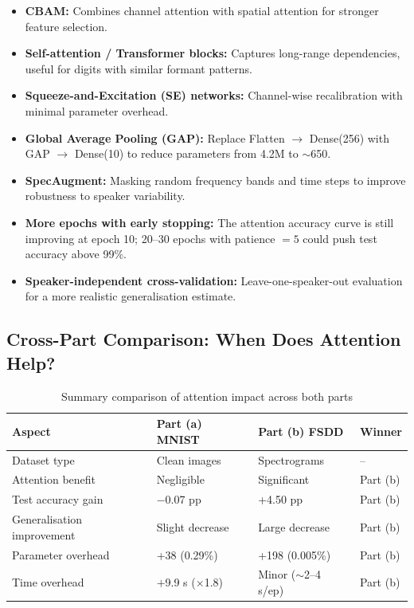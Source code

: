 \begin{itemize}[leftmargin=1.5em]
    \item \textbf{CBAM:} Combines channel attention with spatial attention for
	    stronger feature selection.
    \item \textbf{Self-attention / Transformer blocks:} Captures long-range
	    dependencies, useful for digits with similar formant patterns.
    \item \textbf{Squeeze-and-Excitation (SE) networks:} Channel-wise recalibration
	    with minimal parameter overhead.
    \item \textbf{Global Average Pooling (GAP):} Replace Flatten $\to$ Dense(256)
	    with GAP $\to$ Dense(10) to reduce parameters from 4.2M to $\sim$650.
    \item \textbf{SpecAugment:} Masking random frequency bands and time steps to
	    improve robustness to speaker variability.
    \item \textbf{More epochs with early stopping:} The attention accuracy curve
	    is still improving at epoch 10; 20--30 epochs with patience $= 5$ could
	    push test accuracy above 99\%.
    \item \textbf{Speaker-independent cross-validation:} Leave-one-speaker-out
	    evaluation for a more realistic generalisation estimate.
\end{itemize}

\subsection{Cross-Part Comparison: When Does Attention Help?}

\begin{table}[H]
\centering
\caption{Summary comparison of attention impact across both parts}
\label{tab:cross_comparison}
\begin{tabular}{L{4cm} C{3cm} C{3cm} C{3cm}}
\toprule
{}
\textbf{Aspect} & \textbf{Part (a) MNIST} & \textbf{Part (b) FSDD} & \textbf{Winner} \\
\midrule
Dataset type            & Clean images   & Spectrograms   & -- \\
Attention benefit       & Negligible     & Significant    & Part (b) \\
Test accuracy gain      & $-$0.07 pp     & +4.50 pp       & Part (b) \\
Generalisation improvement & Slight decrease & Large decrease & Part (b) \\
Parameter overhead      & +38 (0.29\%)   & +198 (0.005\%) & Part (b) \\
Time overhead           & $+$9.9 s ($\times$1.8) & Minor ($\sim$2--4 s/ep) & Part (b) \\
\bottomrule
\end{tabular}
\end{table}

